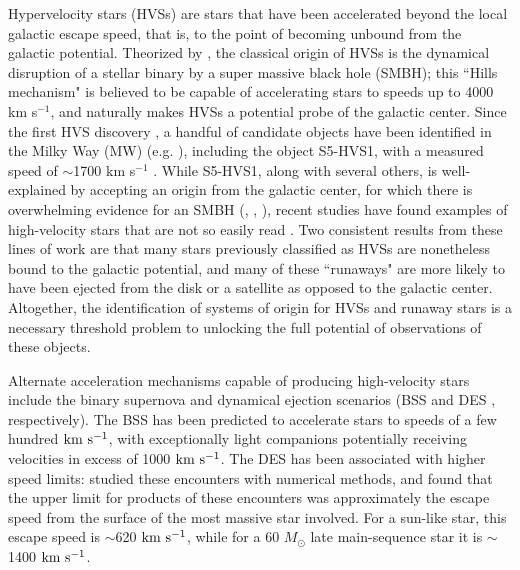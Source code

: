 \documentclass[twocolumn]{aastex631}
\newcommand{\kms}{${\rm km~s^{-1}}$}
\begin{document}
Hypervelocity stars (HVSs) are stars that have been accelerated beyond the local galactic escape speed, that is, to the point of becoming unbound from the galactic potential.
Theorized by \citealt{1988Natur.331..687H}, the classical origin of HVSs is the dynamical disruption of a stellar binary by a super massive black hole (SMBH); this ``Hills mechanism" is believed to be capable of accelerating stars to speeds up to 4000 km s$^{-1}$, and naturally makes HVSs a potential probe of the galactic center.
Since the first HVS discovery \citep{2005ApJ...622L..33B}, a handful of candidate objects have been identified in the Milky Way (MW) (e.g. \citealt{2014ApJ...787...89B}), including the object S5-HVS1, with a measured speed of $\sim$1700 km s$^{-1}$ \citep{2020MNRAS.491.2465K}.
While S5-HVS1, along with several others, is well-explained by accepting an origin from the galactic center, for which there is overwhelming evidence for an SMBH (\citealt{1998ApJ...509..678G}, \citealt{2018A&A...615L..15G}, \citealt{2022ApJ...930L..12E}), recent studies have found examples of high-velocity stars that are not so easily read \citep[e.g.][]{2018MNRAS.479.2789B, 2019MNRAS.483.2007E, 2021A&A...646L...4I}.
Two consistent results from these lines of work are that many stars previously classified as HVSs are nonetheless bound to the galactic potential, and many of these ``runaways" are more likely to have been ejected from the disk or a satellite as opposed to the galactic center.
Altogether, the identification of systems of origin for HVSs and runaway stars is a necessary threshold problem to unlocking the full potential of observations of these objects.

Alternate acceleration mechanisms capable of producing high-velocity stars include the binary supernova and dynamical ejection scenarios (BSS \citep{1967BOTT....4...86P} and DES \citep{1961BAN....15..265B}, respectively).
The BSS has been predicted to accelerate stars to speeds of a few hundred \kms \citep{2019A&A...624A..66R, 2022MNRAS.tmp.3236I}, with exceptionally light companions potentially receiving velocities in excess of 1000 \kms \citep{2015MNRAS.448L...6T}.
The DES has been associated with higher speed limits: \citet{1991AJ....101..562L} studied these encounters with numerical methods, and found that the upper limit for products of these encounters was approximately the escape speed from the surface of the most massive star involved.
For a sun-like star, this escape speed is $\sim$620 \kms, while for a 60 $M_\odot$ late main-sequence star it is $\sim$1400 \kms.
\end{document}
